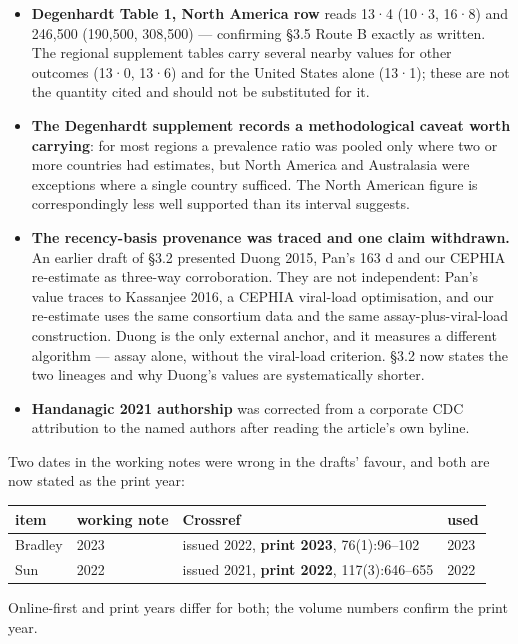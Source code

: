 \begin{itemize}
\tightlist
\item
  \textbf{Degenhardt Table 1, North America row} reads 13·4 (10·3, 16·8) and 246,500 (190,500,
  308,500) --- confirming §3.5 Route B exactly as written. The regional supplement tables carry
  several nearby values for other outcomes (13·0, 13·6) and for the United States alone (13·1);
  these are not the quantity cited and should not be substituted for it.
\item
  \textbf{The Degenhardt supplement records a methodological caveat worth carrying}: for most regions
  a prevalence ratio was pooled only where two or more countries had estimates, but North
  America and Australasia were exceptions where a single country sufficed. The North American
  figure is correspondingly less well supported than its interval suggests.
\item
  \textbf{The recency-basis provenance was traced and one claim withdrawn.} An earlier draft of §3.2
  presented Duong 2015, Pan's 163 d and our CEPHIA re-estimate as three-way corroboration. They
  are not independent: Pan's value traces to Kassanjee 2016, a CEPHIA viral-load optimisation,
  and our re-estimate uses the same consortium data and the same assay-plus-viral-load
  construction. Duong is the only external anchor, and it measures a different algorithm ---
  assay alone, without the viral-load criterion. §3.2 now states the two lineages and why
  Duong's values are systematically shorter.
\item
  \textbf{Handanagic 2021 authorship} was corrected from a corporate CDC attribution to the named
  authors after reading the article's own byline.
\end{itemize}

Two dates in the working notes were wrong in the drafts' favour, and both are now stated as the print year:

{%
\begin{longtable}[]{@{}llll@{}}
\toprule\noalign{}
item & working note & Crossref & used \\
\midrule\noalign{}
\endhead
\bottomrule\noalign{}
\endlastfoot
Bradley & 2023 & issued 2022, \textbf{print 2023}, 76(1):96--102 & 2023 \\
Sun & 2022 & issued 2021, \textbf{print 2022}, 117(3):646--655 & 2022 \\
\end{longtable}
}

Online-first and print years differ for both; the volume numbers confirm the print year.

